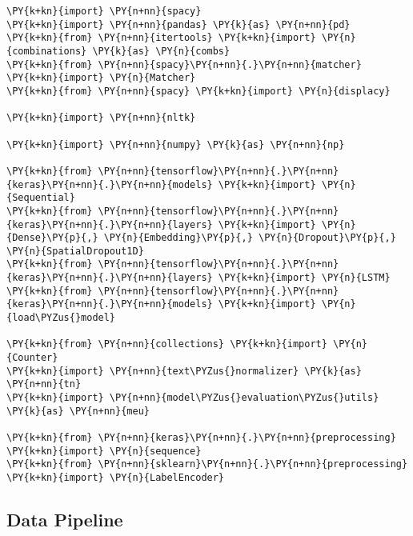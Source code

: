     
    \begin{tcolorbox}[breakable, size=fbox, boxrule=1pt, pad at break*=1mm,colback=cellbackground, colframe=cellborder]
\begin{Verbatim}[commandchars=\\\{\}]
\PY{k+kn}{import} \PY{n+nn}{spacy}
\PY{k+kn}{import} \PY{n+nn}{pandas} \PY{k}{as} \PY{n+nn}{pd}
\PY{k+kn}{from} \PY{n+nn}{itertools} \PY{k+kn}{import} \PY{n}{combinations} \PY{k}{as} \PY{n}{combs}
\PY{k+kn}{from} \PY{n+nn}{spacy}\PY{n+nn}{.}\PY{n+nn}{matcher} \PY{k+kn}{import} \PY{n}{Matcher}
\PY{k+kn}{from} \PY{n+nn}{spacy} \PY{k+kn}{import} \PY{n}{displacy}

\PY{k+kn}{import} \PY{n+nn}{nltk}

\PY{k+kn}{import} \PY{n+nn}{numpy} \PY{k}{as} \PY{n+nn}{np}

\PY{k+kn}{from} \PY{n+nn}{tensorflow}\PY{n+nn}{.}\PY{n+nn}{keras}\PY{n+nn}{.}\PY{n+nn}{models} \PY{k+kn}{import} \PY{n}{Sequential}
\PY{k+kn}{from} \PY{n+nn}{tensorflow}\PY{n+nn}{.}\PY{n+nn}{keras}\PY{n+nn}{.}\PY{n+nn}{layers} \PY{k+kn}{import} \PY{n}{Dense}\PY{p}{,} \PY{n}{Embedding}\PY{p}{,} \PY{n}{Dropout}\PY{p}{,} \PY{n}{SpatialDropout1D}
\PY{k+kn}{from} \PY{n+nn}{tensorflow}\PY{n+nn}{.}\PY{n+nn}{keras}\PY{n+nn}{.}\PY{n+nn}{layers} \PY{k+kn}{import} \PY{n}{LSTM}
\PY{k+kn}{from} \PY{n+nn}{tensorflow}\PY{n+nn}{.}\PY{n+nn}{keras}\PY{n+nn}{.}\PY{n+nn}{models} \PY{k+kn}{import} \PY{n}{load\PYZus{}model}

\PY{k+kn}{from} \PY{n+nn}{collections} \PY{k+kn}{import} \PY{n}{Counter}
\PY{k+kn}{import} \PY{n+nn}{text\PYZus{}normalizer} \PY{k}{as} \PY{n+nn}{tn}
\PY{k+kn}{import} \PY{n+nn}{model\PYZus{}evaluation\PYZus{}utils} \PY{k}{as} \PY{n+nn}{meu}

\PY{k+kn}{from} \PY{n+nn}{keras}\PY{n+nn}{.}\PY{n+nn}{preprocessing} \PY{k+kn}{import} \PY{n}{sequence}
\PY{k+kn}{from} \PY{n+nn}{sklearn}\PY{n+nn}{.}\PY{n+nn}{preprocessing} \PY{k+kn}{import} \PY{n}{LabelEncoder}
\end{Verbatim}
\end{tcolorbox}

    \hypertarget{data-pipeline}{%
\subsection{Data Pipeline}\label{data-pipeline}}

